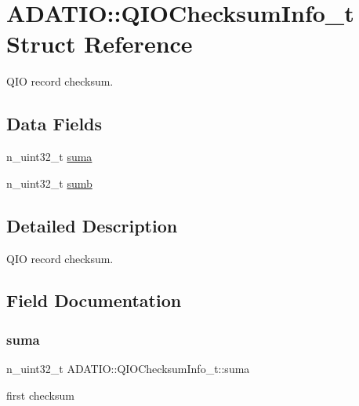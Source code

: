 \hypertarget{structADATIO_1_1QIOChecksumInfo__t}{}\section{A\+D\+A\+T\+IO\+:\+:Q\+I\+O\+Checksum\+Info\+\_\+t Struct Reference}
\label{structADATIO_1_1QIOChecksumInfo__t}


Q\+IO record checksum.  


\subsection*{Data Fields}
\begin{DoxyCompactItemize}
\item 
n\+\_\+uint32\+\_\+t \mbox{\hyperlink{structADATIO_1_1QIOChecksumInfo__t_a74274c0d6b82e7ccd83626568b7f438b}{suma}}
\item 
n\+\_\+uint32\+\_\+t \mbox{\hyperlink{structADATIO_1_1QIOChecksumInfo__t_a0dc2ba8892851e8c40bfdd35dc10416f}{sumb}}
\end{DoxyCompactItemize}


\subsection{Detailed Description}
Q\+IO record checksum. 

\subsection{Field Documentation}
\mbox{\label{structADATIO_1_1QIOChecksumInfo__t_a74274c0d6b82e7ccd83626568b7f438b}} 
\subsubsection{\texorpdfstring{suma}{suma}}
{\footnotesize\ttfamily n\+\_\+uint32\+\_\+t A\+D\+A\+T\+I\+O\+::\+Q\+I\+O\+Checksum\+Info\+\_\+t\+::suma}

first checksum \mbox{\label{structADATIO_1_1QIOChecksumInfo__t_a0dc2ba8892851e8c40bfdd35dc10416f}} 
